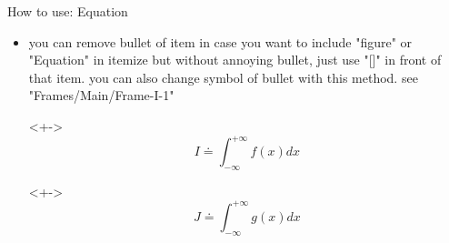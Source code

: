 \begin{frame}{How to use: Equation}
\begin{itemize}
    \begin{block}{Sample Block}
    This is a Sample Block, for example see \cite{wunsch2012}
    \end{block}
        
    \item<+-> you can remove bullet of item in case you want to include "figure" or "Equation" in itemize but without annoying bullet, just use "[]" in front of that item. you can also change symbol of bullet with this method. see "Frames/Main/Frame-I-1"
    
    \item[\ding{112}]<+->
    $$
    I \doteq \int_{-\infty}^{+\infty} f(x) dx  
    $$
    
    \item[]<+->
    $$
    J \doteq \int_{-\infty}^{+\infty} g(x) dx  
    $$
\end{itemize}
    
\end{frame}